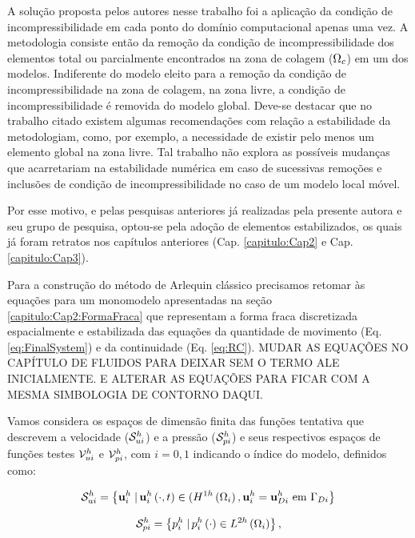 \documentclass[tese_patricia]{subfiles}
\begin{document}
A solução proposta pelos autores nesse trabalho foi a aplicação da condição de incompressibilidade em cada ponto do domínio computacional apenas uma vez. A metodologia consiste então da remoção da condição de incompressibilidade dos elementos total ou parcialmente encontrados na zona de colagem ($\Omega_c$) em um dos modelos. Indiferente do modelo eleito para a remoção da condição de incompressibilidade na zona de colagem, na zona livre, a condição de incompressibilidade é removida do modelo global. Deve-se destacar que no trabalho citado existem algumas recomendações com relação a estabilidade da metodologiam, como, por exemplo, a necessidade de existir pelo menos um elemento global na zona livre. Tal trabalho não explora as possíveis mudanças que acarretariam na estabilidade numérica em caso de sucessivas remoções e inclusões de condição de incompressibilidade no caso de um modelo local móvel.

Por esse motivo, e pelas pesquisas anteriores já realizadas pela presente autora e seu grupo de pesquisa, optou-se pela adoção de elementos estabilizados, os quais já foram retratos nos capítulos anteriores (Cap. \ref{capitulo:Cap2} e Cap. \ref{capitulo:Cap3}).

Para a construção do método de Arlequin clássico precisamos retomar às equações para um monomodelo apresentadas na seção \ref{capitulo:Cap2:FormaFraca} que representam a forma fraca discretizada espacialmente e estabilizada das equações da quantidade de movimento (Eq. \ref{eq:FinalSystem}) e da continuidade (Eq. \ref{eq:RC}). MUDAR AS EQUAÇÕES NO CAPÍTULO DE FLUIDOS PARA DEIXAR SEM O TERMO ALE INICIALMENTE. E ALTERAR AS EQUAÇÕES PARA FICAR COM A MESMA SIMBOLOGIA DE CONTORNO DAQUI.

Vamos considera os espaços de dimensão finita das funções tentativa que descrevem a velocidade ($\mathcal{S}_{ui}^h$) e a pressão ($\mathcal{S}_{pi}^h$) e seus respectivos espaços de funções testes $\mathcal{V}_{ui}^h$ e $\mathcal{V}_{pi}^h$, com $i = 0,1$ indicando o índice do modelo, definidos como:

\begin{align}
	\mathcal{S}_{ui}^h = \left\{\mathbf{u}_{i}^{h} \left . \right| \mathbf{u}_{i}^{h} \left(\cdot,t\right) \in (H^{1h}\left(\Omega_{i}\right), \mathbf{u}_{i}^{h} = \mathbf{u}_{Di}^{h} \textrm { em}  \ \Gamma_{Di} \right\}
\end{align}

\begin{align}
	\mathcal{S}_{pi}^h = \left\{p_{i}^{h} \left . \right| p_{i}^{h} \left(\cdot\right) \in L^{2h}\left(\Omega_{i}\right) \right\},
\end{align}
\end{document}
